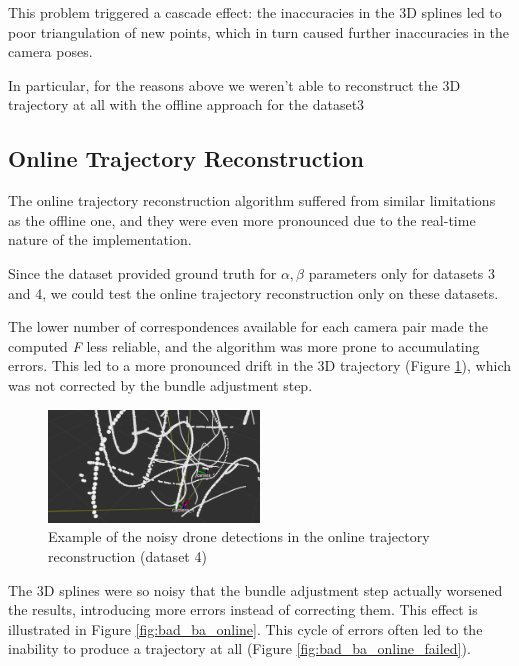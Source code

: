 \documentclass[11pt]{article}
\begin{document}
This problem triggered a cascade effect: the inaccuracies in the 3D splines led to poor triangulation of new points, which in turn caused further inaccuracies in the camera poses.

In particular, for the reasons above we weren't able to reconstruct the 3D trajectory at all with the offline approach for the dataset3

\subsection{Online Trajectory Reconstruction}

The online trajectory reconstruction algorithm suffered from similar limitations as the offline one, and they were even more pronounced due to the real-time nature of the implementation.

Since the dataset provided ground truth for $\alpha,\beta$ parameters only for datasets 3 and 4, we could test the online trajectory reconstruction only on these datasets.

The lower number of correspondences available for each camera pair made the computed \textit{F} less reliable, and the algorithm was more prone to accumulating errors. This led to a more pronounced drift in the 3D trajectory (Figure \ref{fig:online_noisy_detections}), which was not corrected by the bundle adjustment step.

\begin{figure}[h]
    \centering
    \includegraphics[width=0.5\textwidth]{imgs/online_noisy_detections.png}
    \caption{Example of the noisy drone detections in the online trajectory reconstruction (dataset 4)}
    \label{fig:online_noisy_detections}
\end{figure}

The 3D splines were so noisy that the bundle adjustment step actually worsened the results, introducing more errors instead of correcting them. This effect is illustrated in Figure \ref{fig:bad_ba_online}. This cycle of errors often led to the inability to produce a trajectory at all (Figure \ref{fig:bad_ba_online_failed}).
\end{document}
